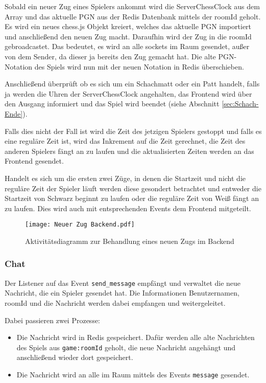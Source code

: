 Sobald ein neuer Zug eines Spielers ankommt wird die ServerChessClock aus dem Array und das aktuelle PGN aus der Redis Datenbank mittels der roomId geholt. Es wird ein neues chess.js Objekt kreiert, welches das aktuelle PGN importiert und anschließend den neuen Zug macht. Daraufhin wird der Zug in die roomId gebroadcastet. Das bedeutet, es wird an alle sockets im Raum gesendet, außer von dem Sender, da dieser ja bereits den Zug gemacht hat. Die alte PGN-Notation des Spiels wird nun mit der neuen Notation in Redis überschieben.

Anschließend überprüft ob es sich um ein Schachmatt oder ein Patt handelt, falls ja werden die Uhren der ServerChessClock angehalten, das Frontend wird über den Ausgang informiert und das Spiel wird beendet (siehe Abschnitt \ref{sec:Schach-Ende}). 

Falls dies nicht der Fall ist wird die Zeit des jetzigen Spielers gestoppt und falls es eine reguläre Zeit ist, wird das Inkrement auf die Zeit gerechnet, die Zeit des anderen Spielers fängt an zu laufen und die aktualisierten Zeiten werden an das Frontend gesendet.

Handelt es sich um die ersten zwei Züge, in denen die Startzeit und nicht die reguläre Zeit der Spieler läuft werden diese gesondert betrachtet und entweder die Startzeit von Schwarz beginnt zu laufen oder die reguläre Zeit von Weiß fängt an zu laufen. Dies wird auch mit entsprechenden Events dem Frontend mitgeteilt.

\begin{figure}[h!]
\centering
\texttt{[image: Neuer Zug Backend.pdf]}
\caption{Aktivitätsdiagramm zur Behandlung eines neuen Zugs im Backend}
\label{fig:Zug-Backend}
\end{figure}

\subsubsection{Chat}
Der Listener auf das Event \verb|send_message| empfängt und verwaltet die neue Nachricht, die ein Spieler gesendet hat. Die Informationen Benutzernamen, roomId und die Nachricht werden dabei empfangen und weitergeleitet.

Dabei passieren zwei Prozesse:
\begin{itemize}
\item Die Nachricht wird in Redis gespeichert. Dafür werden alle alte Nachrichten des Spiels aus \verb|game:roomId| geholt, die neue Nachricht angehängt und anschließend wieder dort gespeichert.
\item Die Nachricht wird an alle im Raum mittels des Events \verb|message| gesendet.
\end{itemize}

